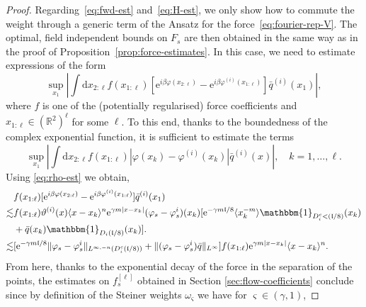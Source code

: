 \documentclass[11pt, a4paper]{scrartcl}
\numberwithin{equation}{section}
\theoremstyle{plain}
\theoremstyle{remark}
\newcommand{\mathd}{\mathrm{d}}
\newcommand{\mathe}{\mathrm{e}}
\begin{document}
\begin{proof}
	Regarding~\eqref{eq:fwd-est} and~\eqref{eq:H-est}, we only show how to
	commute the weight through a generic term of the Ansatz for the
	force~\eqref{eq:fourier-rep-V}. The optimal, field independent bounds on
	$F_s$ are then obtained in the same way as in the proof of
	Proposition~\ref{prop:force-estimates}. In this case, we need to estimate
	expressions of the form
	\[ \sup_{x_1} \left| \int \mathd x_{2 : \ell} f (x_{1 : \ell}) [\mathe^{i
					\beta \varphi (x_{2 : \ell})} - \mathe^{i \beta \varphi^{(i)} (x_{1 :
						\ell})}]  \bar{q}^{(i)} (x_1) \right|, \]
	where $f$ is one of the (potentially regularised) force coefficients and
	$x_{1 : \ell} \in (\mathbb{R}^2)^{\ell}$ for some $\ell$. To this end,
	thanks to the boundedness of the complex exponential function, it is
	sufficient to estimate the terms
	\[ \sup_{x_1}  \left| \int \mathd x_{2 : \ell} f (x_{1 : \ell}) | \varphi
		(x_k) - \varphi^{(i)} (x_k) |  \bar{q}^{(i)} (x) \right|, \quad k = 1,
		\ldots, \ell . \]
	Using \eqref{eq:rho-est} we obtain,
	\begin{equation}
		\begin{aligned}
			         & f (x_{1 : \ell}) [\mathe^{i \beta \varphi (x_{2 : \ell})} - \mathe^{i
			\beta \varphi^{(i)} (x_{1 : \ell})}]  \bar{q}^{(i)} (x_1)                        \\
			\lesssim & f (x_{1 : \ell}) \vartheta^{(i)} (x) \langle x - x_k \rangle^n
			\mathe^{\gamma m | x - x_k |} (\varphi_s - \varphi_s^i) (x_k) [\mathe^{-
						\gamma m\mathfrak{l}/ 8} \langle x_k^{- m} \rangle \mathbbm{1}_{D_i^c
			<      (\mathfrak{l}/ 8)} (x_k)                                                  \\
			         & + \bar{q} (x_k) \mathbbm{1}_{D_i (\mathfrak{l}/
			8)} (x_k)] .                                                                     \\
			\lesssim & [\mathe^{- \gamma m\mathfrak{l}/ 8}  \| \varphi_s -
					\varphi_s^i \|_{L^{\infty, - n} (D_i^c (\mathfrak{l}/ 8))} + \|
					(\varphi_s - \varphi_s^i)  \bar{q} \|_{L^{\infty}}] f (x_{1 : \ell})
			\mathe^{\gamma m | x - x_k |} \langle x - x_k \rangle^n .
		\end{aligned} \label{eq:exp-sep}
	\end{equation}
	From here, thanks to the exponential decay of the force in the separation of
	the points, the estimates on $f^{[\ell]}_s$ obtained in Section
	\ref{sec:flow-coefficients} conclude since by definition of the Steiner
	weights $\omega_{\varsigma}$ we have for $\varsigma \in (\gamma, 1)$,

\end{proof}
\end{document}
